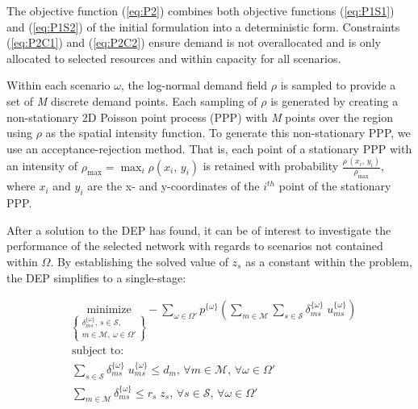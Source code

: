 \documentclass[onecolumn,draftcls]{IEEEtran}
\begin{document}
The objective function (\ref{eq:P2}) combines both objective functions (\ref{eq:P1S1}) and (\ref{eq:P1S2}) of the initial formulation into a deterministic form.  Constraints (\ref{eq:P2C1}) and (\ref{eq:P2C2})	ensure demand is not overallocated and is only allocated to selected resources and within capacity for all scenarios.

Within each scenario $\omega$, the log-normal demand field $\rho$ is sampled to provide a set of \textit{M} discrete demand points.  Each sampling of $\rho$ is generated by creating a non-stationary 2D Poisson point process (PPP) with \textit{M} points over the region using $\rho$ as the spatial intensity function.  To generate this non-stationary PPP, we use an acceptance-rejection method.  That is, each point of a stationary PPP with an intensity of $\rho_{\max} = \max_i\rho\left(x_i,\, y_i\right)$ is retained with probability $\frac{\rho\,\left(x_i,\, y_i\right)}{\rho_{\max}}$, where $x_i$ and $y_i$ are the x- and y-coordinates of the $i^{th}$ point of the stationary PPP.

After a solution to the DEP has found, it can be of interest to investigate the performance of the selected network with regards to scenarios not contained within $\Omega$.  By establishing the solved value of $z_s$ as a constant within the problem, the DEP simplifies to a single-stage:

\vspace{5mm}
\begin{tcolorbox}[title = Problem 3 (One-Stage Simplified DEP)]
\begin{align}
& 
\underset{\left\{ \substack{
	\delta_{ms}^{\{\omega\}},\,	s \in \mathcal{S},\\
	m \in \mathcal{M},\, \omega \in \Omega'} \right\}} {\text{minimize}}
- \sum_{\omega \in \Omega'} p^{\{\omega\}} \left( \sum_{m \in \mathcal{M}} \sum_{s \in \mathcal{S}} \delta_{ms}^{\{\omega\}} \; u_{ms}^{\{\omega\}} \right) \label{eq:P3}\\
& \text{subject to:}  \nonumber \\
& \sum_{s \in \mathcal{S}} \delta_{ms}^{\{\omega\}} \; u_{ms}^{\{\omega\}} \leq d_m,\, \forall m \in \mathcal{M},\, \forall \omega \in \Omega' \label{eq:P3C1}\\
& \sum_{m \in \mathcal{M}} \delta_{ms}^{\{\omega\}} \leq r_s \; z_s,\, \forall s \in \mathcal{S},\, \forall \omega \in \Omega' \label{eq:P3C2}
\end{align}
\end{tcolorbox}
\end{document}
